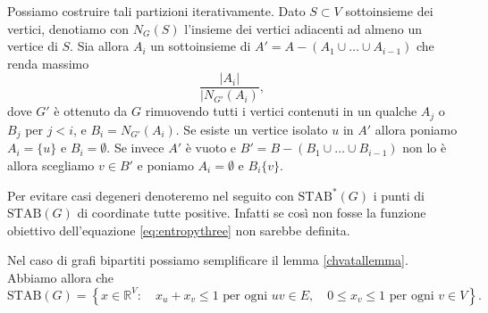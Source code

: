 Possiamo costruire tali partizioni iterativamente. Dato \(S\subset V\) sottoinsieme dei vertici, denotiamo con \(N_G(S)\) l'insieme dei vertici adiacenti ad almeno un vertice di \(S\). Sia allora \(A_i\) un sottoinsieme di \(A'=A-(A_1\cup\dots\cup A_{i-1})\) che renda massimo
\[\frac{|A_i|}{|N_{G'}(A_i)},\]
dove \(G'\) \`e ottenuto da \(G\) rimuovendo tutti i vertici contenuti in un qualche \(A_j\) o \(B_j\) per \(j<i\), e \(B_i=N_{G'}(A_i)\). Se esiste un vertice isolato \(u\) in \(A'\) allora poniamo \(A_i=\{u\}\) e \(B_i=\emptyset\). Se invece \(A'\) \`e vuoto e \(B'=B-(B_1\cup\dots\cup B_{i-1})\) non lo \`e allora scegliamo \(v\in B'\) e poniamo \(A_i=\emptyset\) e \(B_i\{v\}\).

Per evitare casi degeneri denoteremo nel seguito con \(\text{STAB}^{*}(G)\) i punti di \(\text{STAB}(G)\) di coordinate tutte positive. Infatti se così non fosse la funzione obiettivo dell'equazione \ref{eq:entropythree} non sarebbe definita.

Nel caso di grafi bipartiti possiamo semplificare il lemma \ref{chvatallemma}. Abbiamo allora che
\[\text{STAB}(G)=\left\{x\in \mathbb{R}^V:\quad x_u + x_v\le 1 \text{ per ogni } uv\in E,\quad 0\le x_v\le 1 \text{ per ogni } v\in V\right\}.\]

